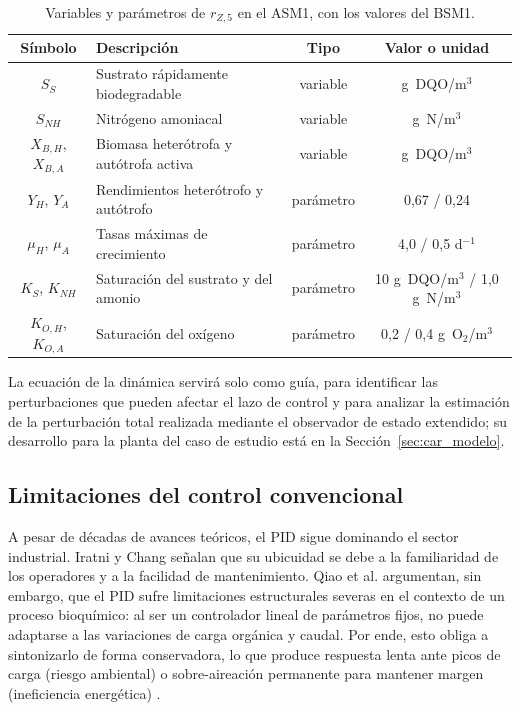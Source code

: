 \begin{table}[H]
\centering
\caption{Variables y parámetros de $r_{Z,5}$ en el ASM1, con los valores del BSM1.}
\label{tab:intro_asm1}
\renewcommand{\arraystretch}{1.0}
\footnotesize
\begin{tabular}{|c|l|c|c|}
\hline
\rowcolor[gray]{0.9}
\textbf{Símbolo} & \textbf{Descripción} & \textbf{Tipo} & \textbf{Valor o unidad} \\ \hline
$S_S$ & Sustrato rápidamente biodegradable & variable & g~DQO/m$^3$ \\ \hline
$S_{NH}$ & Nitrógeno amoniacal & variable & g~N/m$^3$ \\ \hline
$X_{B,H}$, $X_{B,A}$ & Biomasa heterótrofa y autótrofa activa & variable & g~DQO/m$^3$ \\ \hline
$Y_H$, $Y_A$ & Rendimientos heterótrofo y autótrofo & parámetro & 0,67 / 0,24 \\ \hline
$\mu_H$, $\mu_A$ & Tasas máximas de crecimiento & parámetro & 4,0 / 0,5 d$^{-1}$ \\ \hline
$K_S$, $K_{NH}$ & Saturación del sustrato y del amonio & parámetro & 10 g~DQO/m$^3$ / 1,0 g~N/m$^3$ \\ \hline
$K_{O,H}$, $K_{O,A}$ & Saturación del oxígeno & parámetro & 0,2 / 0,4 g~O$_2$/m$^3$ \\ \hline
\end{tabular}
\end{table}

La ecuación de la dinámica servirá solo como guía, para identificar las perturbaciones que pueden
afectar el lazo de control y para analizar la estimación de la perturbación total realizada mediante el
observador de estado extendido; su desarrollo para la planta del caso de estudio está en la
Sección~\ref{sec:car_modelo}.

\subsection{Limitaciones del control convencional}

A pesar de décadas de avances teóricos, el PID sigue dominando el sector
industrial. Iratni y Chang \cite{iratni2019advances} señalan que su
ubicuidad se debe a la familiaridad de los operadores y a la facilidad de
mantenimiento. Qiao et al. \cite{qiao2016self} argumentan, sin embargo, que el
PID sufre limitaciones estructurales severas en el contexto de un proceso bioquímico: al ser un
controlador lineal de parámetros fijos, no puede adaptarse a las variaciones
de carga orgánica y caudal. Por ende, esto obliga a sintonizarlo de forma conservadora,
lo que produce respuesta lenta ante picos de carga (riesgo ambiental) o
sobre-aireación permanente para mantener margen (ineficiencia energética)
\cite{wei2020disturbance}.

